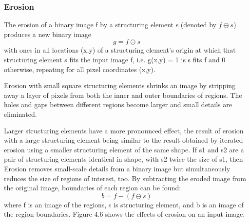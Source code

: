 \documentclass[journal]{IEEEtran}
\begin{document}
\subsubsection{Erosion}
The erosion of a binary image f by a structuring element s (denoted by $ f \ominus s $)
produces a new binary image
\[g = f \ominus s \]
with ones in all locations (x,y) of a structuring element’s origin at which that
structuring element s fits the input image f, i.e. g(x,y) = 1 is s fits f and 0 otherwise, repeating for
all pixel coordinates (x,y). \par
Erosion with small square structuring elements shrinks an image by stripping away a layer of
pixels from both the inner and outer boundaries of regions. The holes and gaps between different
regions become larger and small details are eliminated.\par
Larger structuring elements have a more pronounced effect, the result of erosion with a large
structuring element being similar to the result obtained by iterated erosion using a smaller structuring element of the same shape. If s1 and s2 are a pair of structuring elements identical in shape,
with s2 twice the size of s1, then
Erosion removes small-scale details from a binary image but simultaneously reduces the size of regions of interest, too. By subtracting the eroded image from the original image, boundaries of each region can be found:
\[ b = f - (f \ominus s) \]
where f is an image of the regions, s is structuring element, and b is an image of the region boundaries. Figure 4.6 shows the effects of erosion on an input image.
\end{document}
